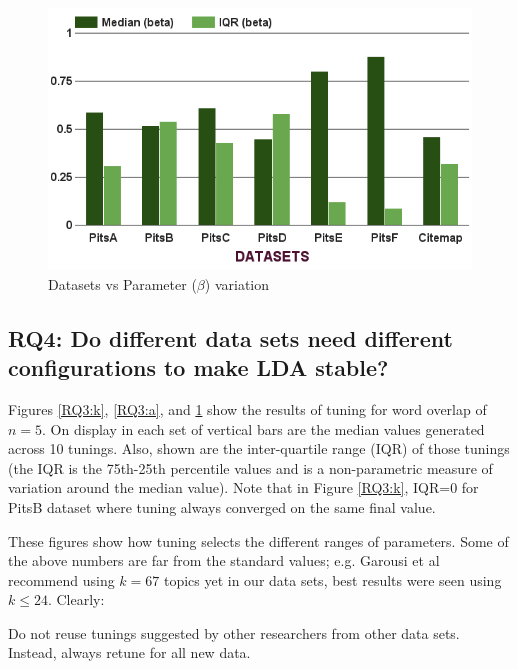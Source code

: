\documentclass[twocolumn,5p,sort&compress]{elsarticle}
\theoremstyle{break}
\begin{document}
\begin{figure}[!htbp]
\begin{minipage}{.33\textwidth}
        \includegraphics[width=\linewidth]{./fig/Parameters_variation_b.png}
        \caption{Datasets vs Parameter ($\beta$) variation}
        \label{RQ3:b}
    \end{minipage}
\end{figure}

\subsection{\textbf{RQ4: Do different data sets
      need different configurations to make LDA stable?}}\label{sect:diff}

Figures \ref{RQ3:k}, \ref{RQ3:a}, and \ref{RQ3:b} show the results of tuning for word overlap of $n=5$.
On display in each set of vertical bars are
the median values generated across 10 tunings.
Also, shown are
the inter-quartile range (IQR) of those tunings (the IQR is the 75th-25th percentile values and is a non-parametric measure of variation
around the median value). Note that in Figure \ref{RQ3:k}, IQR=0 for  PitsB dataset where tuning
          always converged on the same final value.

  These figures
show how tuning selects the different ranges  of
parameters. 
Some of the above numbers are far from the standard values; e.g. Garousi et al~\cite{garousi2016citations} recommend using $k=67$ topics
yet in our data sets, best results were seen using $k \le 24$.
Clearly:

\begin{lesson}
  Do not  reuse tunings suggested by other researchers from other data sets.
  Instead, always retune for all new data.
\end{lesson}
\end{document}
